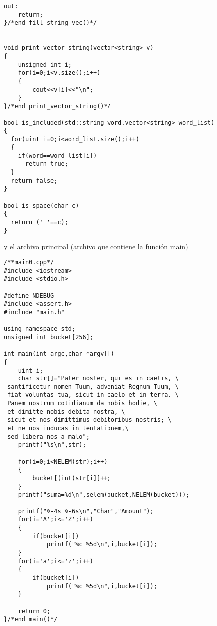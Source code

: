 \documentclass[12pt]{article}
\begin{document}
\begin{verbatim}
out:
    return;
}/*end fill_string_vec()*/


void print_vector_string(vector<string> v)
{
    unsigned int i;
    for(i=0;i<v.size();i++)
    {
        cout<<v[i]<<"\n";
    }
}/*end print_vector_string()*/

bool is_included(std::string word,vector<string> word_list)
{
  for(uint i=0;i<word_list.size();i++)
  {
    if(word==word_list[i])
      return true;
  }
  return false;
}

bool is_space(char c)
{
  return (' '==c);
}

\end{verbatim}
y el archivo principal (archivo que contiene la funci\'{o}n main)
\begin{verbatim}
/**main0.cpp*/
#include <iostream>
#include <stdio.h>

#define NDEBUG
#include <assert.h>
#include "main.h"

using namespace std;
unsigned int bucket[256];

int main(int argc,char *argv[])
{
    uint i;
    char str[]="Pater noster, qui es in caelis, \
 santificetur nomen Tuum, adveniat Regnum Tuum, \
 fiat voluntas tua, sicut in caelo et in terra. \
 Panem nostrum cotidianum da nobis hodie, \
 et dimitte nobis debita nostra, \
 sicut et nos dimittimus debitoribus nostris; \
 et ne nos inducas in tentationem,\
 sed libera nos a malo";
    printf("%s\n",str);

    for(i=0;i<NELEM(str);i++)
    {
        bucket[(int)str[i]]++;
    }
    printf("suma=%d\n",selem(bucket,NELEM(bucket)));

    printf("%-4s %-6s\n","Char","Amount");
    for(i='A';i<='Z';i++)
    {
        if(bucket[i])
            printf("%c %5d\n",i,bucket[i]);
    }
    for(i='a';i<='z';i++)
    {
        if(bucket[i])
            printf("%c %5d\n",i,bucket[i]);
    }

    return 0;
}/*end main()*/

\end{verbatim}
\end{document}
